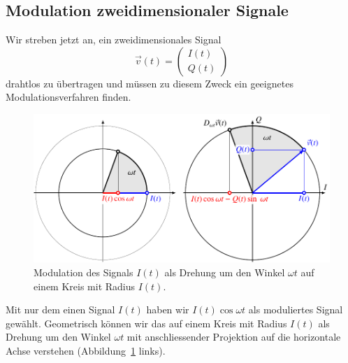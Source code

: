 %
%
%
\subsection{Modulation zweidimensionaler Signale
\label{subsection:modulation}}
Wir streben jetzt an, ein zweidimensionales Signal
\[
\vec{v}(t)
=
\begin{pmatrix}I(t)\\Q(t)\end{pmatrix}
\]
drahtlos zu übertragen und müssen zu diesem Zweck ein geeignetes
Modulationsverfahren finden.

\begin{figure}
\centering
\includegraphics{applications/qam/images/icos.pdf}
\caption{Modulation des Signals $I(t)$ als Drehung um den Winkel $\omega t$
auf einem Kreis mit Radius $I(t)$.
\label{qam:figure:icos}}
\end{figure}
Mit nur dem einen Signal $I(t)$ haben wir $I(t)\cos\omega t$ als moduliertes
Signal gewählt.
Geometrisch können wir das auf einem Kreis mit Radius $I(t)$ als Drehung
um den Winkel $\omega t$ mit anschliessender Projektion auf die horizontale
Achse verstehen (Abbildung~\ref{qam:figure:icos} links).

